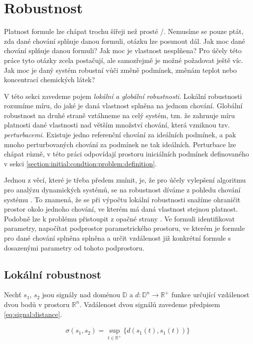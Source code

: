\section{Robustnost}\label{section:robustness}

Platnost formule lze chápat trochu šířeji než prosté /.
Nemusíme se pouze ptát, zda dané chování splňuje danou formuli, otázku lze posunout dál.
Jak moc dané chování splňuje danou formuli? Jak moc je vlastnost nesplňena? Pro účely
této práce tyto otázky zcela postačují, ale samozřejmě je možné požadovat ještě víc.
Jak moc je daný systém robustní vůči změně podmínek, změnám teplot nebo koncentrací
chemických látek?

V této sekci zavedeme pojem \textit{lokální a globální robustnosti}. Lokální robustnosti
rozumíme míru, do jaké je daná vlastnost splněna na jednom chování. Globální robustnost
na druhé straně vztáhneme na celý systém, tzn. že zahrnuje míru platnosti dané vlastnosti
nad větším množství chování, která vzniknou tzv. \textit{perturbacemi}. Existuje jedno
referenční chování za ideálních podmínek, a pak mnoho perturbovaných chování za podmínek
ne tak i\-deál\-ních. Perturbace lze chápat různě, v této práci odpovídají prostoru i\-ni\-ciál\-ních
podmínek definovaného v sekci \ref{section:initial:condtion:problem:definition}. 

Jednou z věcí, které je třeba předem zmínit, je, že pro účely vylepšení algoritmu pro
analýzu dynamických systémů, se na robustnost díváme z pohledu chování systému \cite{donze2011}.
To znamená, že se při výpočtu lokální robustnosti snažíme ohraničit prostor okolo jednoho chování,
ve kterém má daná vlastnost stejnou platnost. Podobně lze k problému přistoupit z opačné strany \cite{rizk2009}.
Ve formuli identifikovat parametry, napočítat podprostor parametrického prostoru, ve kterém je formule
pro dané chování splněna splněna a určit vzdálenost již konkrétní formule s dosazenými parametry
od tohoto podprostoru.

\subsection{Lokální robustnost}

Nechť $s_1$, $s_2$ jsou signály nad doménou $\mathbb{D}$ a $d: \mathbb{D}^n \rightarrow \mathbb{R}^{+}$
funkce určující vzdálenost dvou bodů v prostoru $\mathbb{R}^n$. 
Vzdálenost dvou signálů zavedeme předpisem \ref{eq:signal:distance}.

\begin{align}\label{eq:signal:distance}
\sigma(s_1, s_2) = {\displaystyle \sup_{t \in \mathbb{R}^{+}}} \{d(s_1(t), s_1(t))\}
\end{align}

